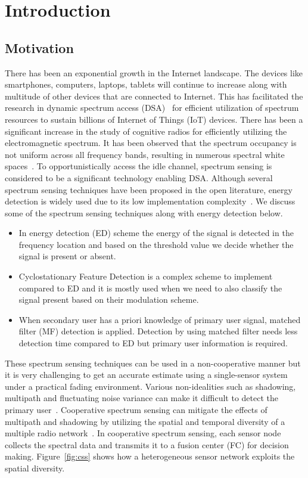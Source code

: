 \chapter{Introduction}
\label{ch:introduction}
\section{Motivation}
There has been an exponential growth in the Internet landscape. The devices like smartphones, computers, laptops, tablets will continue to increase along with multitude of other devices that are connected to Internet. This has facilitated the research in dynamic spectrum access (DSA)~\cite{arhtn2,arhtn3} for efficient utilization of spectrum resources to sustain billions of Internet of Things (IoT) devices. There has been a significant increase in the study of cognitive radios for efficiently utilizing the electromagnetic spectrum. It has been observed that the spectrum occupancy is not uniform across all frequency bands, resulting in numerous spectral white spaces~\cite{bookhtn1}. To opportunistically access the idle channel, spectrum sensing is considered to be a significant technology enabling DSA. Although several spectrum sensing techniques have been proposed in the open literature, energy detection is widely used due to its low implementation complexity~\cite{arhtn4}. We discuss some of the spectrum sensing techniques along with energy detection below.
\begin{itemize}
\item In energy detection (ED) scheme the energy of the signal is detected in the frequency location and based on the threshold value we decide whether the signal is present or absent.

\item Cyclostationary Feature Detection is a complex scheme to implement compared to ED and it is mostly used when we need to also classify the signal present based on their modulation scheme.

\item When secondary user has a priori knowledge of primary user signal, matched  filter (MF)  detection  is  applied. Detection by using matched filter needs less detection time compared to ED but primary user information is required.
\end{itemize}

These spectrum sensing techniques can be used in a non-cooperative manner but it is very challenging to get an accurate estimate using a single-sensor system under a practical fading environment. Various non-idealities such as shadowing, multipath and fluctuating noise variance can make it difficult to detect the primary user~\cite{inphtn5,inphtn6}. Cooperative spectrum sensing can mitigate the effects of multipath and shadowing by utilizing the spatial and temporal diversity of a multiple radio network~\cite{inphtn7,inphtn8}. In cooperative spectrum sensing, each sensor node collects the spectral data and transmits it to a fusion center (FC) for decision making. Figure~\ref{fig:css} shows how a heterogeneous sensor network exploits the spatial diversity. 

